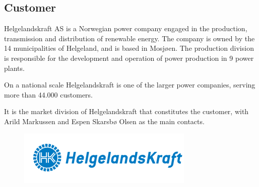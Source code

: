 \subsection{Customer}
Helgelandskraft AS is a Norwegian power company engaged in the production,
transmission and distribution of renewable energy. The company is owned by
the 14 municipalities of Helgeland, and is based in Mosjøen. The production
division is responsible for the development and operation of power production
in 9 power plants.

On a national scale Helgelandskraft is one of the larger power companies,
serving more than 44.000 customers.

It is the market division of Helgelandskraft that constitutes the customer,
with Arild Markussen and Espen Skarsbø Olsen as the main contacts. \cite{helgelandskraft}

\begin{figure}[H]
	\includegraphics[scale=1.0]{pictures/helgelandskraft.png}
\end{figure}
